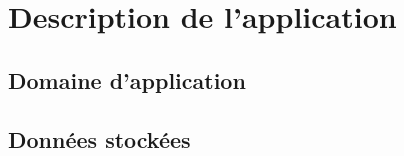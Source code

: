 \section{Description de l'application}
\subsection{Domaine d'application}

\subsection{Données stockées}







	